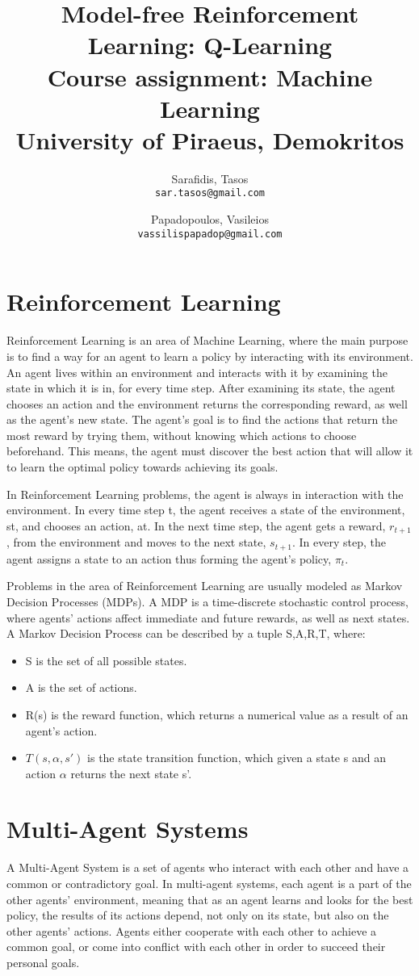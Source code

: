 \documentclass[10pt,a4paper,twocolumn]{article}
\title{%
		Model-free Reinforcement Learning: Q-Learning \\
	\large Course assignment: Machine Learning \\
			University of Piraeus, Demokritos}
\author{
	Sarafidis, Tasos\\
	\texttt{sar.tasos@gmail.com}
	\and
	Papadopoulos, Vasileios\\
	\texttt{vassilispapadop@gmail.com}
}
\begin{document}
	\maketitle
	
	\section{Reinforcement Learning}
	Reinforcement Learning is an area of Machine Learning, where the main purpose is to find a way for an agent to learn a policy by interacting with its environment. An agent lives within an environment and interacts with it by examining the state in which it is in, for every time step. After examining its state, the agent chooses an action and the environment returns the corresponding reward, as well as the agent’s new state. The agent’s goal is to find the actions that return the most reward by trying them, without knowing which actions to choose beforehand. This means, the agent must discover the best action that will allow it to learn the optimal policy towards achieving its goals.
	
	In Reinforcement Learning problems, the agent is always in interaction with the environment. In every time step t, the agent receives a state of the environment, st, and chooses an action, at. In the next time step, the agent gets a reward, $r_{t+1}$, from the environment and moves to the next state, $s_{t+1}$. In every step, the agent assigns a state to an action thus forming the agent’s policy, $\pi_{t}$.
	
	Problems in the area of Reinforcement Learning are usually modeled as Markov Decision Processes (MDPs). A MDP is a time-discrete stochastic control process, where agents’ actions affect immediate and future rewards, as well as next states. A Markov Decision Process can be described by a tuple {S,A,R,T}, where:
	
	\begin{itemize}
		\item S is the set of all possible states. 
		\item A is the set of actions.
		\item R(s) is the reward function, which returns a numerical value as a result of an agent’s action.
		\item $T(s,\alpha,s')$ is the state transition function, which given a state s and an action $\alpha$ returns the next state s'.
	\end{itemize}
	
	\section{Multi-Agent Systems}
	A Multi-Agent System is a set of agents who interact with each other and have a common or contradictory goal. In multi-agent systems, each agent is a part of the other agents’ environment, meaning that as an agent learns and looks for the best policy, the results of its actions depend, not only on its state, but also on the other agents’ actions. Agents either cooperate with each other to achieve a common goal, or come into conflict with each other in order to succeed their personal goals.
	
\end{document}
